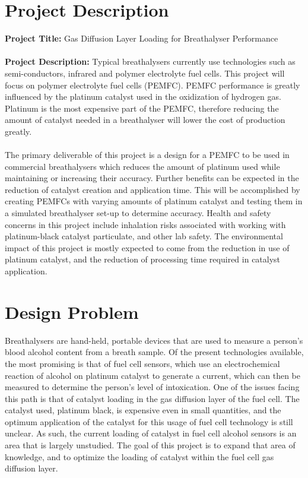 \documentclass{article}
\begin{document}
	\section{Project Description}
		\textbf{Project Title:} Gas Diffusion Layer Loading for Breathalyser Performance \\ \\
		\textbf{Project Description:}
		Typical breathalysers currently use technologies such as semi-conductors, infrared and polymer electrolyte fuel cells. This project will focus on polymer electrolyte fuel cells (PEMFC). PEMFC performance is greatly influenced by the platinum catalyst used in the oxidization of hydrogen gas. Platinum is the most expensive part of the PEMFC, therefore reducing the amount of catalyst needed in a breathalyser will lower the cost of production greatly.\\ \\
		The primary deliverable of this project is a design for a PEMFC to be used in commercial breathalysers which reduces the amount of platinum used while maintaining or increasing their accuracy. Further benefits can be expected in the reduction of catalyst creation and application time. This will be accomplished by creating PEMFCs with varying amounts of platinum catalyst and testing them in a simulated breathalyser set-up to determine accuracy. Health and safety concerns in this project include inhalation risks associated with working with platinum-black catalyst particulate, and other lab safety. The environmental impact of this project is mostly expected to come from the reduction in use of platinum catalyst, and the reduction of processing time required in catalyst application.
	\section{Design Problem}
		Breathalysers are hand-held, portable devices that are used to measure a person's blood alcohol content from a breath sample. Of the present technologies available, the most promising is that of fuel cell sensors, which use an electrochemical reaction of alcohol on platinum catalyst to generate a current, which can then be measured to determine the person's level of intoxication. One of the issues facing this path is that of catalyst loading in the gas diffusion layer of the fuel cell. The catalyst used, platinum black, is expensive even in small quantities, and the optimum application of the catalyst for this usage of fuel cell technology is still unclear. As such, the current loading of catalyst in fuel cell alcohol sensors is an area that is largely unstudied. The goal of this project is to expand that area of knowledge, and to optimize the loading of catalyst within the fuel cell gas diffusion layer.
\end{document}
